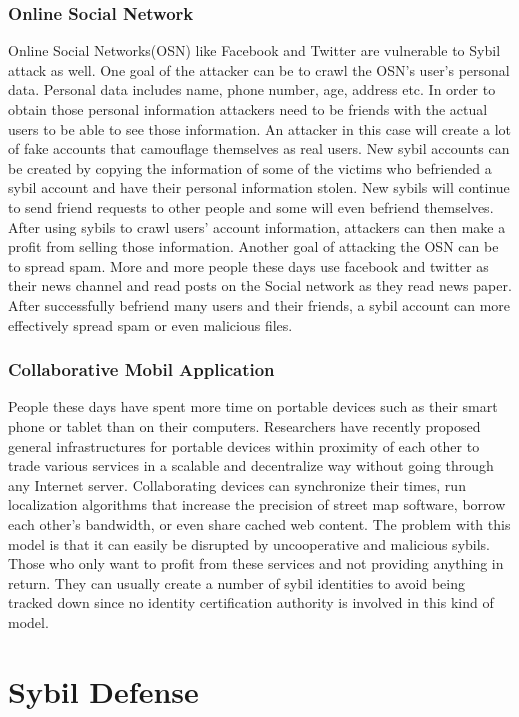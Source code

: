 \documentclass[conference]{IEEEtran}
\begin{document}
\subsubsection{Online Social Network}
Online Social Networks(OSN) like Facebook and Twitter are vulnerable to Sybil attack as well. One goal of the attacker can be to crawl the OSN's user's personal data.
Personal data includes name, phone number, age, address etc. In order to obtain those personal information
attackers need to be friends with the actual users to be able to see those information.
An attacker in this case will create a lot of fake accounts that camouflage themselves as real users. New sybil accounts can be created by copying the information of some of the victims
who befriended a sybil account and have their personal information stolen. New sybils will continue to send friend requests to other people and some will even befriend themselves.
After using sybils to crawl users' account information, attackers can then make a profit from selling those information. Another goal of attacking the OSN can be to spread spam.
More and more people these days use facebook and twitter as their news channel and read posts on the Social network as they read news paper. 
After successfully befriend many users and their friends, a sybil account can more effectively spread spam or even malicious files.

\subsubsection{Collaborative Mobil Application}
People these days have spent more time on portable devices such as their smart phone or tablet than on their computers.
Researchers have recently proposed general infrastructures for portable devices within proximity of each other to trade various services
in a scalable and decentralize way without going through any Internet server. Collaborating devices can synchronize their times, run localization algorithms 
that increase the precision of street map software, borrow each other's bandwidth, or even share cached web content. The problem with this model is that it can 
easily be disrupted by uncooperative and malicious sybils. Those who only want to profit from these services and not providing anything in return.
They can usually create a number of sybil identities to avoid being tracked down since no identity certification authority is involved in this kind of model.\cite{quercia10mobile}

\section{Sybil Defense} \label{SybilDefense}
\end{document}
